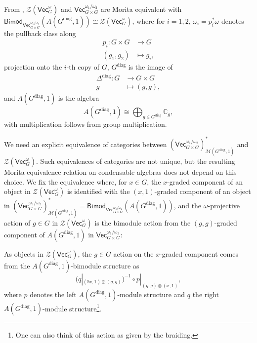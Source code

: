 \documentclass[aps,twocolumn,prx,floatfix,preprintnumbers, nofootinbib,10pt]{revtex4-2}
\numberwithin{equation}{section}
\theoremstyle{definition}
\newcommand{\be}{\begin{equation}}
\newcommand{\ee}{\end{equation}}
\newcommand{\nn}{\nonumber}
\newcommand{\bC}{{\mathbb C}}
\newcommand{\cM}{\mathcal{M}}
\newcommand{\cZ}{\mathcal{Z}}
\renewcommand{\Vec}{\mathsf{Vec}}
\newcommand{\Bimod}{\mathsf{Bimod}}
\newcommand{\diag}{\text{diag}}
\begin{document}
From \cite{Ostrikmodule}, $\cZ(\Vec_G^\omega)$ and $\Vec_{G\times G}^{\omega_1/\omega_2}$ are Morita equivalent with $\Bimod_{\Vec_{G\times G}^{\omega_1/\omega_2}}(A(G^{\diag},1))\cong \cZ(\Vec_G^\omega)$, where 
for $i=1,2$, $\omega_i=p_i^*\omega$ denotes the pullback class along 
\begin{align}
    p_i:G \times G & \rightarrow G\nn\\
    (g_1,g_2) & \mapsto g_i,
\end{align}
projection onto the $i$-th copy of $G$, $G^\diag$ is the image of 
\begin{equation}
    \begin{split}
        \Delta^\diag:G & \rightarrow G\times G\\
        g & \mapsto (g, g),
    \end{split}
\end{equation}
and $A(G^\diag,1)$ is the algebra
\begin{equation}
    A(G^\diag,1) \cong \bigoplus_{g\in G^\diag}\bC_g,
\end{equation}
with multiplication follows from group multiplication.

We need an explicit equivalence of categories between $(\Vec_{G\times G}^{\omega_1/\omega_2})_{\cM(G^{\diag}, 1)}^*$ and $\cZ(\Vec_G^\omega)$. 
Such equivalences of categories are not unique, but the resulting Morita equivalence relation on condensable algebras does not depend on this choice. We fix the equivalence where, for $x\in G$, the $x$-graded component of an object in $\cZ(\Vec_G^\omega)$ is identified with the $(x,1)$-graded component of an object in $(\Vec_{G\times G}^{\omega_1/\omega_2})_{\cM(G^{\diag}, 1)}^*=\Bimod_{\Vec_{G\times G}^{\omega_1/\omega_2}}(A(G^{\diag},1))$, and the $\omega$-projective action of $g\in G$ in $\cZ(\Vec_G^\omega)$ is the bimodule action from the $(g,g)$-graded component of $A(G^{\diag},1)$ in $\Vec_{G\times G}^{\omega_1/\omega_2}$:

As objects in $\cZ(\Vec_G^\omega)$, the $g\in G$ action on the $x$-graded component comes from the $A(G^{\diag},1)$-bimodule structure as
\be
    (q|_{({}^gx, 1)\otimes (g,g)})^{-1} \circ p|_{(g,g)\otimes (x,1)},
\ee
where $p$ denotes the left $A(G^{\diag},1)$-module structure and $q$ the right $A(G^{\diag},1)$-module structure\footnote{One can also think of this action as given by the braiding.}. 
\end{document}
